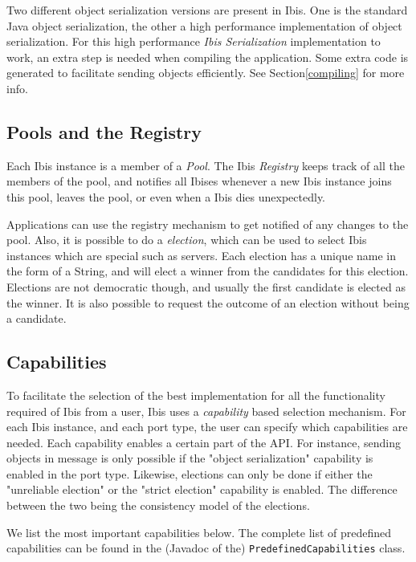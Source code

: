 \documentclass[10pt]{article}
\begin{document}
Two different object serialization versions are present in Ibis.  One is
the standard Java object serialization, the other a high performance
implementation of object serialization. For this high performance
\emph{Ibis Serialization} implementation to work, an extra step is needed
when compiling the application. Some extra code is generated to
facilitate sending objects efficiently. See Section\ref{compiling} for
more info.

\subsection{Pools and the Registry}


Each Ibis instance is a member of a \emph{Pool}. The Ibis
\emph{Registry} keeps track of all the members of the pool, and notifies
all Ibises whenever a new Ibis instance joins this pool, leaves the
pool, or even when a Ibis dies unexpectedly.

Applications can use the registry mechanism to get notified of any
changes to the pool. Also, it is possible to do a \emph{election}, which
can be used to select Ibis instances which are special such as servers.
Each election has a unique name in the form of a String, and will elect
a winner from the candidates for this election. Elections are not
democratic though, and usually the first candidate is elected as the
winner. It is also possible to request the outcome of an election
without being a candidate. 

\subsection{Capabilities}

To facilitate the selection of the best implementation for all the
functionality required of Ibis from a user, Ibis uses a
\emph{capability} based selection mechanism. For each Ibis instance, and
each port type, the user can specify which capabilities are needed. Each
capability enables a certain part of the API. For instance, sending
objects in message is only possible if the "object serialization"
capability is enabled in the port type. Likewise, elections can only be
done if either the "unreliable election" or the "strict election"
capability is enabled. The difference between the two being the
consistency model of the elections. 

We list the most important capabilities below. The complete list of
predefined capabilities can be found in the (Javadoc of the)
\texttt{PredefinedCapabilities} class.
\end{document}
